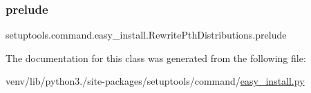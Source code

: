 \subsubsection{\texorpdfstring{prelude}{prelude}}
{\footnotesize\ttfamily setuptools.\+command.\+easy\+\_\+install.\+Rewrite\+Pth\+Distributions.\+prelude\hspace{0.3cm}{\ttfamily [static]}}



The documentation for this class was generated from the following file\+:\begin{DoxyCompactItemize}
\item 
venv/lib/python3./site-\/packages/setuptools/command/\hyperlink{easy__install_8py}{easy\+\_\+install.\+py}\end{DoxyCompactItemize}
